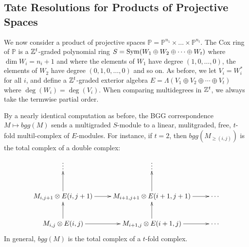 \documentclass[twoside,12pt, leqno]{amsart}
\def\PP{{\mathbb P}}
\DeclareMathOperator{\rH}{{\rm H}}
\def\bT{{\bf T}}
\def\bU{{\bf U}}
\def\rH{{\rm H}}
\begin{document}
% 
% 

\subsection{Tate Resolutions for Products of Projective Spaces}\label{subsec:products}
We now consider a product of projective spaces $\PP = \PP^{n_1}\times \ldots \times \PP^{n_{t}}$.  The Cox ring of $\PP$ is a ${\mathbb Z}^{t}$-graded polynomial ring $S=\operatorname{Sym} (W_1\oplus W_2 \oplus \cdots \oplus W_t)$ where $\dim W_i=n_i+1$ and where the elements of $W_1$ have degree $(1,0,\dots,0)$, the elements of $W_2$ have degree $(0,1,0,\dots,0)$ and so on.  As before, we let $V_i=W_i^*$ for all $i$, and define a ${\mathbb Z}^{t}$-graded exterior algebra $E=\Lambda (V_1\oplus V_2\oplus \cdots \oplus V_t)$ where $\deg(W_i)=\deg(V_i)$.  When comparing multidegrees in ${\mathbb Z}^t$, we always take the termwise partial order.  

By a nearly identical computation as before, the BGG correspondence $M\mapsto bgg(M)$ sends a multigraded $S$-module to a linear, mulitgraded, free, $t$-fold multil-complex of $E$-modules.  For instance, if $t=2$, then $bgg(M_{\ge(i,j)})$ is the total complex of a double complex:
\begin{equation}\label{eqn:uppercorner}
\xymatrix{ \vdots & \vdots & \\
 M_{i,j+1}\otimes E(i,j+1) \ar[r]\ar[u]& M_{i+1,j+1}\otimes E(i+1,j+1)\ar[u] \ar[r] & \cdots \\
 M_{i,j}\otimes E(i,j) \ar[r]\ar[u]& M_{i+1,j}\otimes E(i+1,j) \ar[u]  \ar[r] & \cdots \\
}
\end{equation}
In general, $bgg(M)$ is the total complex of a $t$-fold complex.
\end{document}
